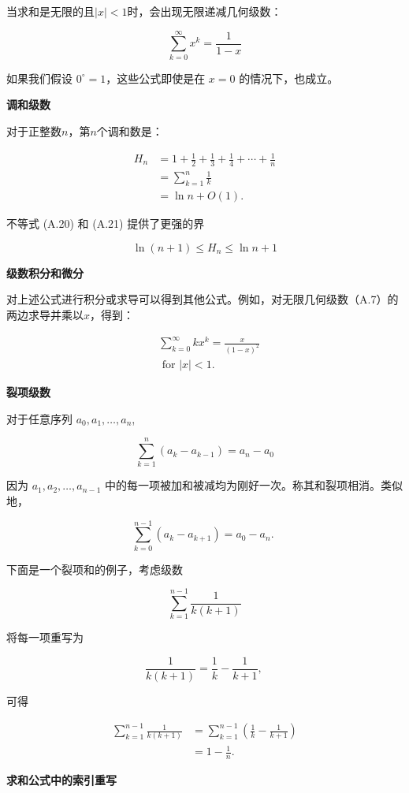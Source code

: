 \documentclass[lang=cn,newtx,10pt,scheme=chinese]{elegantbook}
\begin{document}
当求和是无限的且$|x|<1$时，会出现无限递减几何级数：

$$
\sum_{k=0}^{\infty} x^k=\frac{1}{1-x}
$$

如果我们假设 $0^{\circ}=1$，这些公式即使是在 $x=0$ 的情况下，也成立。

\textbf{调和级数}

对于正整数$n$，第$n$个调和数是：

$$
\begin{aligned}
H_n & =1+\frac{1}{2}+\frac{1}{3}+\frac{1}{4}+\cdots+\frac{1}{n} \\
& =\sum_{k=1}^n \frac{1}{k} \\
& =\ln n+O(1) .
\end{aligned}
$$

不等式 (A.20) 和 (A.21) 提供了更强的界

$$
\ln (n+1) \leq H_n \leq \ln n+1
$$

\textbf{级数积分和微分}

对上述公式进行积分或求导可以得到其他公式。例如，对无限几何级数（A.7）的两边求导并乘以$x$，得到：

$$
\begin{aligned}
& \sum_{k=0}^{\infty} k x^k=\frac{x}{(1-x)^2} \\
& \text { for }|x|<1 .
\end{aligned}
$$

\textbf{裂项级数}

对于任意序列 $a_0, a_1, \ldots, a_n$,

$$
\sum_{k=1}^n\left(a_k-a_{k-1}\right)=a_n-a_0
$$

因为 $a_1, a_2, \ldots, a_{n-1}$ 中的每一项被加和被减均为刚好一次。称其和裂项相消。类似地，

$$
\sum_{k=0}^{n-1}\left(a_k-a_{k+1}\right)=a_0-a_n \text {. }
$$

下面是一个裂项和的例子，考虑级数

$$
\sum_{k=1}^{n-1} \frac{1}{k(k+1)}
$$

将每一项重写为

$$
\frac{1}{k(k+1)}=\frac{1}{k}-\frac{1}{k+1} \text {, }
$$

可得

$$
\begin{aligned}
\sum_{k=1}^{n-1} \frac{1}{k(k+1)} & =\sum_{k=1}^{n-1}\left(\frac{1}{k}-\frac{1}{k+1}\right) \\
& =1-\frac{1}{n} .
\end{aligned}
$$

\textbf{求和公式中的索引重写}
\end{document}
